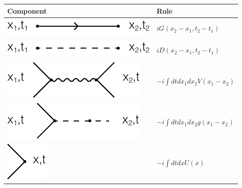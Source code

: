 \documentclass[12pt]{book}
\begin{document}
	\begin{table}[htp!]
		\centering
		\begin{tabular}{| >{\centering\arraybackslash}m{15em}|>{\centering\arraybackslash} m{12em}|}
		\hline
		\vspace{0.5ex}Component\vspace{0.5ex}&\vspace{0.5ex}Rule\vspace{0.5ex}\\
		\hline
		\vspace{2.5ex}\includegraphics[scale=1]{resources/chap_feyn_diag/fdiag_frule1.pdf}\vspace{1ex}&$iG(x_2-x_1,t_2-t_1)$\vspace{0.5ex}\\
		\hline
		\vspace{2.5ex}\includegraphics[scale=1]{resources/chap_feyn_diag/fdiag_frule2.pdf}\vspace{1ex}&$iD(x_2-x_1,t_2-t_1)$\vspace{0.5ex}\\
		\hline
		\vspace{2.5ex}\includegraphics[scale=1]{resources/chap_feyn_diag/fdiag_frule3.pdf}\vspace{1ex}&$-i\int dtdx_1dx_2V(x_1-x_2)$\vspace{0.5ex}\\
		\hline
		\vspace{2.5ex}\includegraphics[scale=1]{resources/chap_feyn_diag/fdiag_frule4.pdf}\vspace{1ex}&$-i\int dtdx_1dx_2g(x_1-x_2)$\vspace{0.5ex}\\
		\hline
		\vspace{2.5ex}\includegraphics[scale=1]{resources/chap_feyn_diag/fdiag_frule5.pdf}\vspace{1ex}&$-i\int dtdxU(x)$\vspace{0.5ex}\\

\end{tabular}
\end{table}
\end{document}
